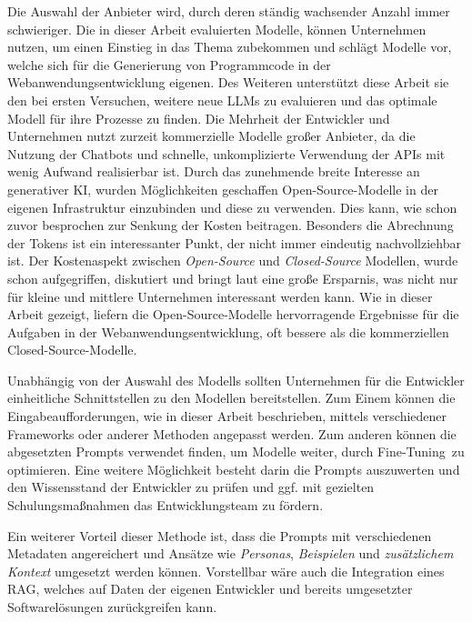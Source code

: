 Die Auswahl der Anbieter wird, durch deren ständig wachsender Anzahl immer schwieriger. Die in dieser Arbeit evaluierten Modelle, können Unternehmen nutzen, um einen Einstieg in das Thema zubekommen und schlägt Modelle vor, welche sich für die Generierung von Programmcode in der Webanwendungsentwicklung eigenen. Des Weiteren unterstützt diese Arbeit sie den bei ersten Versuchen, weitere neue LLMs zu evaluieren und das optimale Modell für ihre Prozesse zu finden. Die Mehrheit der Entwickler und Unternehmen nutzt zurzeit kommerzielle Modelle großer Anbieter, da die Nutzung der Chatbots und schnelle, unkomplizierte Verwendung der APIs mit wenig Aufwand realisierbar ist. Durch das zunehmende breite Interesse an generativer KI, wurden Möglichkeiten geschaffen Open-Source-Modelle in der eigenen Infrastruktur einzubinden und diese zu verwenden. Dies kann, wie schon zuvor besprochen zur Senkung der Kosten beitragen. Besonders die Abrechnung der Tokens ist ein interessanter Punkt, der nicht immer eindeutig nachvollziehbar ist. Der Kostenaspekt zwischen \textit{Open-Source} und \textit{Closed-Source} Modellen, wurde schon aufgegriffen, diskutiert und bringt laut \cite{irugalbandara-2023} eine große Ersparnis, was nicht nur für kleine und mittlere Unternehmen interessant werden kann. Wie in dieser Arbeit gezeigt, liefern die Open-Source-Modelle hervorragende Ergebnisse für die Aufgaben in der Webanwendungsentwicklung, oft bessere als die kommerziellen Closed-Source-Modelle.\vspace{0.2cm}

Unabhängig von der Auswahl des Modells sollten Unternehmen für die Entwickler einheitliche Schnittstellen zu den Modellen bereitstellen. Zum Einem können die Eingabeaufforderungen, wie in dieser Arbeit beschrieben, mittels verschiedener Frameworks oder anderer Methoden angepasst werden. Zum anderen können die abgesetzten Prompts verwendet finden, um Modelle weiter, durch \glqq Fine-Tuning\grqq \ zu optimieren. Eine weitere Möglichkeit besteht darin die Prompts auszuwerten und den Wissensstand der Entwickler zu prüfen und ggf. mit gezielten Schulungsmaßnahmen das Entwicklungsteam zu fördern.\vspace{0.2cm}

Ein weiterer Vorteil dieser Methode ist, dass die Prompts mit verschiedenen Metadaten angereichert und Ansätze wie \textit{Personas}, \textit{Beispielen} und \textit{zusätzlichem Kontext} umgesetzt werden können. Vorstellbar wäre auch die Integration eines RAG, welches auf Daten der eigenen Entwickler und bereits umgesetzter Softwarelösungen zurückgreifen kann.\vspace{0.2cm}

